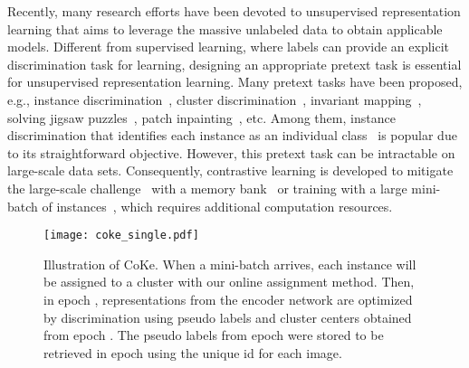 \documentclass[10pt,twocolumn,letterpaper]{article}
\begin{document}
Recently, many research efforts have been devoted to unsupervised representation learning that aims to leverage the massive unlabeled data to obtain applicable models. Different from supervised learning, where labels can provide an explicit discrimination task for learning, designing an appropriate pretext task is essential for unsupervised representation learning. Many pretext tasks have been proposed, e.g., instance discrimination~\cite{DosovitskiyFSRB16}, cluster discrimination~\cite{CaronBJD18}, invariant mapping~\cite{ChenH21,GrillSATRBDPGAP20}, solving jigsaw puzzles~\cite{NorooziF16}, patch inpainting~\cite{PathakKDDE16}, etc. Among them, instance discrimination that identifies each instance as an individual class~\cite{DosovitskiyFSRB16} is popular due to its straightforward objective. However, this pretext task can be intractable on large-scale data sets. Consequently, contrastive learning is developed to mitigate the large-scale challenge~\cite{ChenK0H20,He0WXG20,WuXYL18} with a memory bank~\cite{He0WXG20} or training with a large mini-batch of instances~\cite{ChenK0H20}, which requires additional computation resources.



\begin{figure}[t]
\centering
\texttt{[image: coke\_single.pdf]}
\caption{Illustration of CoKe. When a mini-batch arrives, each instance will be assigned to a cluster with our online assignment method. Then, in epoch , representations from the encoder network are optimized by discrimination using pseudo labels and cluster centers obtained from epoch . The pseudo labels from epoch  were stored to be retrieved in epoch  using the unique id for each image.}\label{fig:illu}
\end{figure}
\end{document}
